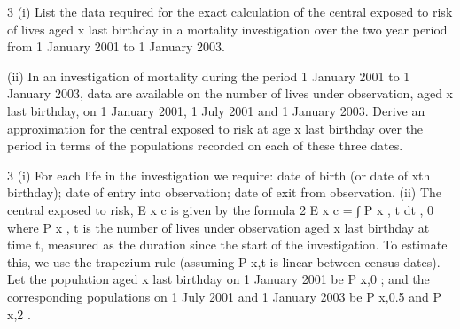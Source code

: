 \documentclass[a4paper,12pt]{article}
\begin{document}

3
(i) List the data required for the exact calculation of the central exposed to risk of
lives aged x last birthday in a mortality investigation over the two year period
from 1 January 2001 to 1 January 2003.

(ii) In an investigation of mortality during the period 1 January 2001 to 1 January
2003, data are available on the number of lives under observation, aged x last
birthday, on 1 January 2001, 1 July 2001 and 1 January 2003.
Derive an approximation for the central exposed to risk at age x last birthday
over the period in terms of the populations recorded on each of these three
dates.

3
(i)
For each life in the investigation we require:
date of birth (or date of xth birthday);
date of entry into observation;
date of exit from observation.
(ii)
The central exposed to risk, E x c is given by the formula
2
E x c = ∫ P x , t dt ,
0
where P x , t is the number of lives under observation aged x last birthday at time
t, measured as the duration since the start of the investigation.
To estimate this, we use the trapezium rule (assuming P x,t is linear between
census dates).
Let the population aged x last birthday on 1 January 2001 be P x,0 ; and the
corresponding populations on 1 July 2001 and 1 January 2003 be P x,0.5 and
P x,2 .
\end{document}
